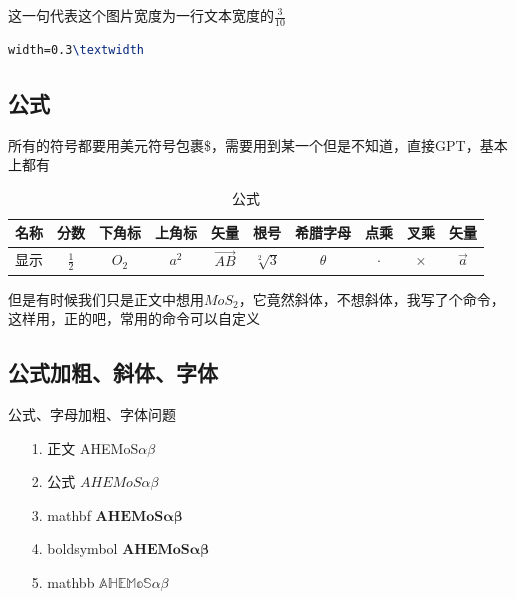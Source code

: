 \documentclass[AutoFakeBold]{LUTThesis}
\begin{document}
这一句代表这个图片宽度为一行文本宽度的$\frac{3}{10}$
\begin{lstlisting}[language = tex]
width=0.3\textwidth
\end{lstlisting}





\subsection{公式} %
\label{sub:公式}
所有的符号都要用美元符号包裹\$，需要用到某一个但是不知道，直接GPT，基本上都有
\begin{table}[H]
    \centering
    \caption{公式}
    \begin{tabular}{cccccccccc} %
        \toprule
        名称 & 分数            & 下角标   & 上角标   & 矢量         & 根号            & 希腊字母     & 点乘      & 叉乘       & 矢量        \\
        \midrule
        显示 & $\frac{1}{2}$ & $O_2$ & $a^2$ & $\vec{AB}$ & $\sqrt[2]{3}$ & $\theta$ & $\cdot$ & $\times$ & $\vec{a}$ \\

        \bottomrule
    \end{tabular}
    \label{tbl_gs}
\end{table}

但是有时候我们只是正文中想用$MoS_2$，它竟然斜体，不想斜体，我写了个命令，这样用，正的吧，常用的命令可以自定义

\subsection{公式加粗、斜体、字体}

公式、字母加粗、字体问题

\begin{itemize}
    \item[1.] 正文 \qquad \quad AHEMoS$\alpha \beta$
    \item[2.] 公式 \qquad \quad $AHEMoS \alpha \beta$
    \item[3.] mathbf \qquad $\mathbf{AHEMoS\alpha \beta}$
    \item[4.] boldsymbol $\boldsymbol{AHEMoS\alpha \beta}$
    \item[5.] mathbb \qquad $\mathbb{AHEMoS\alpha \beta}$
\end{itemize}
\end{document}
